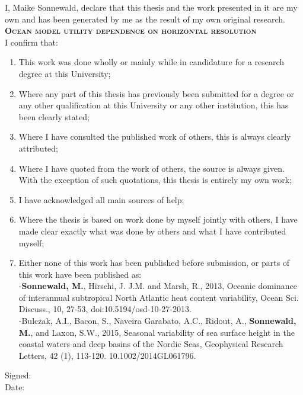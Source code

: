 \documentclass[a4paper,12pt, openright, titlepage]{book}
\begin{document}
\noindent I, Maike Sonnewald, declare that this thesis and the work presented in it are my own and has been generated by me as the result of my own original research.\\[0.3cm]

\textbf{\textsc{\large Ocean model utility dependence on horizontal resolution}}\\[0.3cm]

\noindent I confirm that:\\[-1.5cm]
\begin{enumerate}
\item This work was done wholly or mainly while in candidature for a research degree at this University;
\item Where any part of this thesis has previously been submitted for a degree or any other qualification at this University or any other institution, this has been clearly stated;
\item Where I have consulted the published work of others, this is always clearly attributed;
\item Where I have quoted from the work of others, the source is always given. With the exception of such quotations, this thesis is entirely my own work;
\item I have acknowledged all main sources of help;
\item Where the thesis is based on work done by myself jointly with others, I have made clear exactly what was done by others and what I have contributed myself;
\item Either none of this work has been published before submission, or parts of this work have been published as: \\
 -\textbf{Sonnewald, M.}, Hirschi, J. J.M. and Marsh, R., 2013, Oceanic dominance of interannual subtropical North Atlantic heat content variability, Ocean Sci. Discuss., 10, 27-53, doi:10.5194/osd-10-27-2013.\\
 -Bulczak, A.I., Bacon, S., Naveira Garabato, A.C., Ridout, A., \textbf{Sonnewald, M.}, and Laxon, S.W., 2015, Seasonal variability of sea surface height in the coastal waters and deep basins of the Nordic Seas, Geophysical Research Letters, 42 (1), 113-120. 10.1002/2014GL061796.
\end{enumerate}

Signed:\hrulefill\\%


Date:\hrulefill\\

\clearpage
\end{document}
